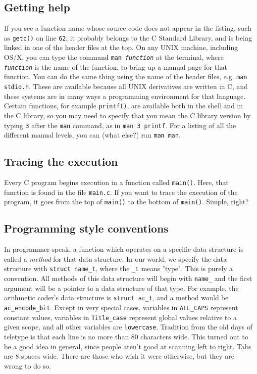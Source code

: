 \documentclass[10pt, fleqn]{article}
\theoremstyle{break}
\newcommand{\0}    {\mathbf{0}}
\numberwithin{equation}{section}
\begin{document}
\subsection{Getting help}
If you see a function name whose source code does not appear in the listing, 
such as {\tt getc()} on line {\tt 62}, it probably belongs to the C Standard
Library, and is being linked in one of the header files at the top. On any UNIX 
machine, including OS/X, you can type the command {\tt man {\em function}} 
at the terminal, where {\tt {\em function}} is the name of the function, to 
bring up a manual page for that function. You can do the same thing using the 
name of the header files, e.g. {\tt man stdio.h}. These are available because all UNIX 
derivatives are written in C, and these systems are in many ways a programming 
environment for that language. Certain functions, for example {\tt printf()}, 
are available both in the shell and in the C library, so you may need to 
specify that you mean the C library version by typing {\tt 3} after the {\tt man}
command, as in {\tt man 3 printf}. For a listing of all the different manual 
levels, you can (what else?) run {\tt man man}.

\subsection{Tracing the execution}
Every C program begins execution in a function called {\tt main()}. Here, that
function is found in the file {\tt main.c}. If you want to trace the execution
of the program, it goes from the top of {\tt main()} to the bottom of 
{\tt main()}. Simple, right?

\subsection{Programming style conventions}

In programmer-speak, a function which operates on a specific data structure
is called a {\em method} for that data structure. In our world, we specify
the data structure with {\tt struct name\_t}, where the {\tt \_t} means "type".
This is purely a convention. All methods of this data structure will begin with 
{\tt name\_} and the first argument will be a pointer to a data structure of 
that type. For example, the arithmetic coder's data structure is 
{\tt struct ac\_t}, and a method would be {\tt ac\_encode\_bit}.
Except in very special cases, variables in {\tt ALL\_CAPS} represent constant
values, variables in {\tt Title\_case} represent global values relative to a 
given scope, and all other variables are {\tt lowercase}. Tradition from the
old days of teletype is that each line is no more than 80 characters wide.
This turned out to be a good idea in general, since people aren't good at 
scanning left to right. Tabs are 8 spaces wide. There are those who wish it 
were otherwise, but they are wrong to do so.
\end{document}
